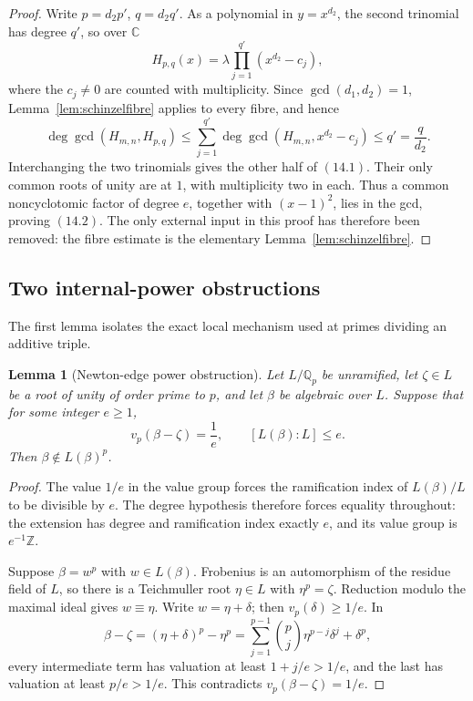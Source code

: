 \documentclass[11pt]{article}
\newtheorem{lemma}[theorem]{Lemma}
\theoremstyle{definition}
\newcommand{\Q}{\mathbb Q}
\newcommand{\Z}{\mathbb Z}
\newcommand{\C}{\mathbb C}
\begin{document}
\begin{proof}
Write \(p=d_2p'\), \(q=d_2q'\).  As a polynomial in
\(y=x^{d_2}\), the second trinomial has degree \(q'\), so over \(\C\)
\[
 H_{p,q}(x)=\lambda
 \prod_{j=1}^{q'}(x^{d_2}-c_j),
\]
where the \(c_j\neq0\) are counted with multiplicity.  Since
\(\gcd(d_1,d_2)=1\), Lemma~\ref{lem:schinzelfibre} applies to every fibre,
and hence
\[
 \deg\gcd(H_{m,n},H_{p,q})
 \leq\sum_{j=1}^{q'}
 \deg\gcd(H_{m,n},x^{d_2}-c_j)
 \leq q'=\frac q{d_2}.
\]
Interchanging the two trinomials gives the other half of \((14.1)\).  Their
only common roots of unity are at \(1\), with multiplicity two in each.
Thus a common noncyclotomic factor of degree \(e\), together with
\((x-1)^2\), lies in the gcd, proving \((14.2)\).  The only external input in this proof has therefore been removed: the fibre estimate is the elementary Lemma~\ref{lem:schinzelfibre}.
\end{proof}

\subsection{Two internal-power obstructions}

The first lemma isolates the exact local mechanism used at primes dividing an
additive triple.

\begin{lemma}[Newton-edge power obstruction]\label{lem:edgepower}
Let \(L/\Q_p\) be unramified, let \(\zeta\in L\) be a root of unity of
order prime to \(p\), and let \(\beta\) be algebraic over \(L\).  Suppose
that for some integer \(e\geq1\),
\[
 v_p(\beta-\zeta)=\frac1e,
 \qquad [L(\beta):L]\leq e.
\]
Then \(\beta\notin L(\beta)^p\).
\end{lemma}

\begin{proof}
The value \(1/e\) in the value group forces the ramification index of
\(L(\beta)/L\) to be divisible by \(e\).  The degree hypothesis therefore
forces equality throughout: the extension has degree and ramification index
exactly \(e\), and its value group is \(e^{-1}\Z\).

Suppose \(\beta=w^p\) with \(w\in L(\beta)\).  Frobenius is an automorphism
of the residue field of \(L\), so there is a Teichmuller root
\(\eta\in L\) with \(\eta^p=\zeta\).  Reduction modulo the maximal ideal
gives \(w\equiv\eta\).  Write \(w=\eta+\delta\); then
\(v_p(\delta)\geq1/e\).  In
\[
 \beta-\zeta=(\eta+\delta)^p-\eta^p
 =\sum_{j=1}^{p-1}\binom pj\eta^{p-j}\delta^j+\delta^p,
\]
every intermediate term has valuation at least \(1+j/e>1/e\), and the last
has valuation at least \(p/e>1/e\).  This contradicts
\(v_p(\beta-\zeta)=1/e\).
\end{proof}
\end{document}
